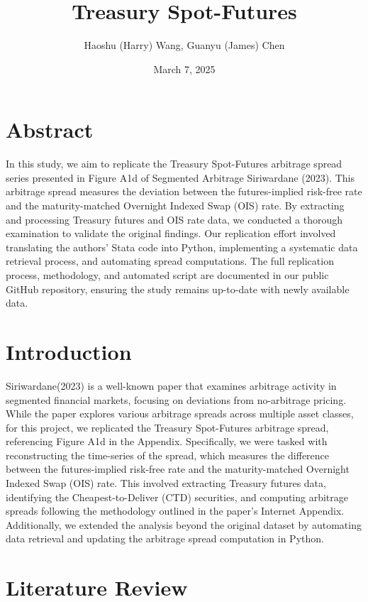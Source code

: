 \documentclass{article}
\title{Treasury Spot-Futures}
\author{Haoshu (Harry) Wang, Guanyu (James) Chen}
\date{March 7, 2025}
\begin{document}
\maketitle
\section{Abstract}

In this study, we aim to replicate the Treasury Spot-Futures arbitrage spread series presented in Figure A1d of Segmented Arbitrage Siriwardane (2023). This arbitrage spread measures the deviation between the futures-implied risk-free rate and the maturity-matched Overnight Indexed Swap (OIS) rate. By extracting and processing Treasury futures and OIS rate data, we conducted a thorough examination to validate the original findings. Our replication effort involved translating the authors' Stata code into Python, implementing a systematic data retrieval process, and automating spread computations. The full replication process, methodology, and automated script are documented in our public GitHub repository, ensuring the study remains up-to-date with newly available data.

\section{Introduction}

Siriwardane(2023) is a well-known paper that examines arbitrage activity in segmented financial markets, focusing on deviations from no-arbitrage pricing. While the paper explores various arbitrage spreads across multiple asset classes, for this project, we replicated the Treasury Spot-Futures arbitrage spread, referencing Figure A1d in the Appendix. Specifically, we were tasked with reconstructing the time-series of the spread, which measures the difference between the futures-implied risk-free rate and the maturity-matched Overnight Indexed Swap (OIS) rate. This involved extracting Treasury futures data, identifying the Cheapest-to-Deliver (CTD) securities, and computing arbitrage spreads following the methodology outlined in the paper’s Internet Appendix. Additionally, we extended the analysis beyond the original dataset by automating data retrieval and updating the arbitrage spread computation in Python.

\section{Literature Review} 
\end{document}
